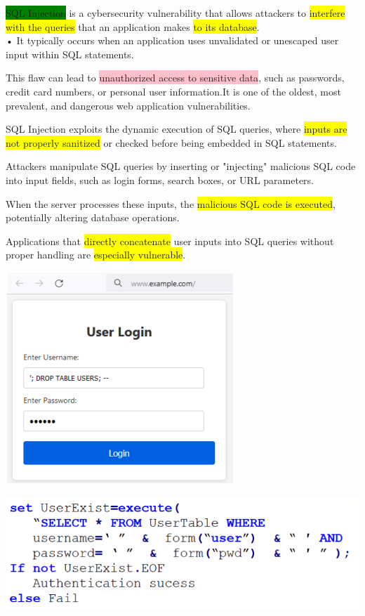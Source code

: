 \documentclass[]{project_plan}
\begin{document}
\colorbox{green}{SQL Injection} is a cybersecurity vulnerability that allows attackers to \colorbox{yellow}{interfere with
  the queries} that an application makes \colorbox{yellow}{to its database}.\\
• It typically occurs when an application uses unvalidated or unescaped user input
within SQL statements.

This flaw can lead to \colorbox{pink}{unauthorized access to sensitive data}, such as passwords,
credit card numbers, or personal user information.It is one of the oldest, most
prevalent, and dangerous web application vulnerabilities.

SQL Injection exploits the dynamic execution of SQL queries, where \colorbox{yellow}{inputs are not
  properly sanitized} or checked before being embedded in SQL statements.

Attackers manipulate SQL queries by inserting or "injecting" malicious SQL code
into input fields, such as login forms, search boxes, or URL parameters.

When the server processes these inputs, the \colorbox{yellow}{malicious SQL code is executed},
potentially altering database operations.

Applications that \colorbox{yellow}{directly concatenate} user inputs into SQL queries without proper
handling are \colorbox{yellow}{especially vulnerable}.

\includegraphics[width=.6\linewidth]{sql i eg1.png}

\includegraphics[width=.6\linewidth]{sql i eg2.png}
\end{document}
